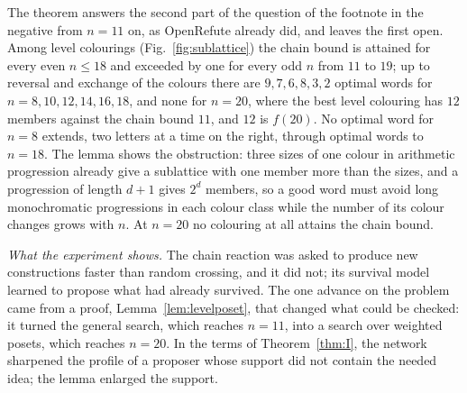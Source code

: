 The theorem answers the second part of the question of the footnote in the negative from $n=11$ on, as OpenRefute already did, and leaves the first open. Among level colourings (Fig.~\ref{fig:sublattice}) the chain bound is attained for every even $n\le18$ and exceeded by one for every odd $n$ from $11$ to $19$; up to reversal and exchange of the colours there are $9,7,6,8,3,2$ optimal words for $n=8,10,12,14,16,18$, and none for $n=20$, where the best level colouring has $12$ members against the chain bound $11$, and $12$ is $f(20)$. No optimal word for $n=8$ extends, two letters at a time on the right, through optimal words to $n=18$. The lemma shows the obstruction: three sizes of one colour in arithmetic progression already give a sublattice with one member more than the sizes, and a progression of length $d+1$ gives $2^{d}$ members, so a good word must avoid long monochromatic progressions in each colour class while the number of its colour changes grows with $n$. At $n=20$ no colouring at all attains the chain bound.

\emph{What the experiment shows.} The chain reaction was asked to produce new constructions faster than random crossing, and it did not; its survival model learned to propose what had already survived. The one advance on the problem came from a proof, Lemma~\ref{lem:levelposet}, that changed what could be checked: it turned the general search, which reaches $n=11$, into a search over weighted posets, which reaches $n=20$. In the terms of Theorem~\ref{thm:I}, the network sharpened the profile of a proposer whose support did not contain the needed idea; the lemma enlarged the support.

